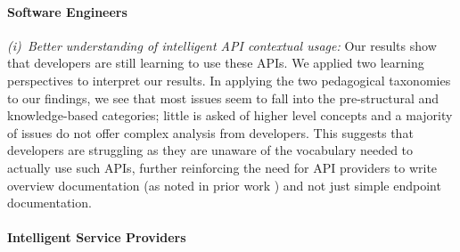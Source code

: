 \paragraph{Software Engineers}
\textit{(i)~Better understanding of intelligent API contextual usage:} Our results show that developers are still learning to use these APIs. We applied two learning perspectives to interpret our results. In applying the two pedagogical taxonomies to our findings, we see that most issues seem to fall into the pre-structural and knowledge-based categories; little is asked of higher level concepts and a majority of issues do not offer complex analysis from developers. This suggests that developers are struggling as they are unaware of the vocabulary needed to actually use such APIs, further reinforcing the need for API providers to write overview documentation (as noted in prior work \citep{Cummaudo:2019th}) and not just simple endpoint documentation. 

\paragraph{Intelligent Service Providers}

